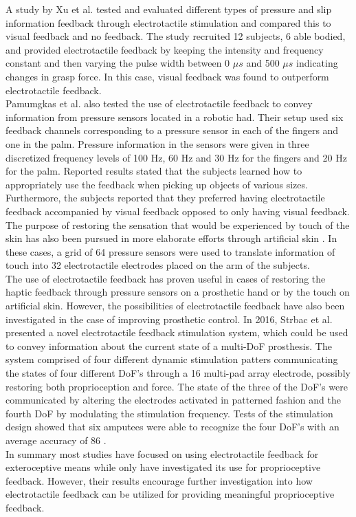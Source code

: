 A study by Xu et al. \cite{Xu2016} tested and evaluated different types of pressure and slip information feedback through electrotactile stimulation and compared this to visual feedback and no feedback. The study recruited 12 subjects, 6 able bodied, and provided electrotactile feedback by keeping the intensity and frequency constant and then varying the pulse width between 0 $\mu s$ and 500 $\mu s$ indicating changes in grasp force. In this case, visual feedback was found to outperform electrotactile feedback. \cite{Xu2016} \\
Pamumgkas et al. \cite{Pamungkas2015} also tested the use of electrotactile feedback to convey information from pressure sensors located in a robotic had. Their setup used six feedback channels corresponding to a pressure sensor in each of the fingers and one in the palm. Pressure information in the sensors were given in three discretized frequency levels of 100 Hz, 60 Hz and 30 Hz for the fingers and 20 Hz for the palm. Reported results stated that the subjects learned how to appropriately use the feedback when picking up objects of various sizes. Furthermore, the subjects reported that they preferred having electrotactile feedback accompanied by visual feedback opposed to only having visual feedback. \cite{Pamungkas2015} 
The purpose of restoring the sensation that would be experienced by touch of the skin has also been pursued in more elaborate efforts through artificial skin \cite{Hartmann2014,Franceschi2015}. In these cases, a grid of 64 pressure sensors were used to translate information of touch into 32 electrotactile electrodes placed on the arm of the subjects. \\
The use of electrotactile feedback has proven useful in cases of restoring the haptic feedback through pressure sensors on a prosthetic hand or by the touch on artificial skin. However, the possibilities of electrotactile feedback have also been investigated in the case of improving prosthetic control. In 2016, Strbac et al. \cite{Strbac2016} presented a novel electrotactile feedback stimulation system, which could be used to convey information about the current state of a multi-DoF prosthesis. The system comprised of four different dynamic stimulation patters communicating the states of four different DoF's through a 16 multi-pad array electrode, possibly restoring both proprioception and force. The state of the three of the DoF's were communicated by altering the electrodes activated in patterned fashion and the fourth DoF by modulating the stimulation frequency. Tests of the stimulation design showed that six amputees were able to recognize the four DoF's with an average accuracy of 86 \percent. \cite{Strbac2016}   \\
In summary most studies have focused on using electrotactile feedback for exteroceptive means while only \cite{Strbac2016} have investigated its use for proprioceptive feedback. However, their results encourage further investigation into how electrotactile feedback can be utilized for providing meaningful proprioceptive feedback.  

